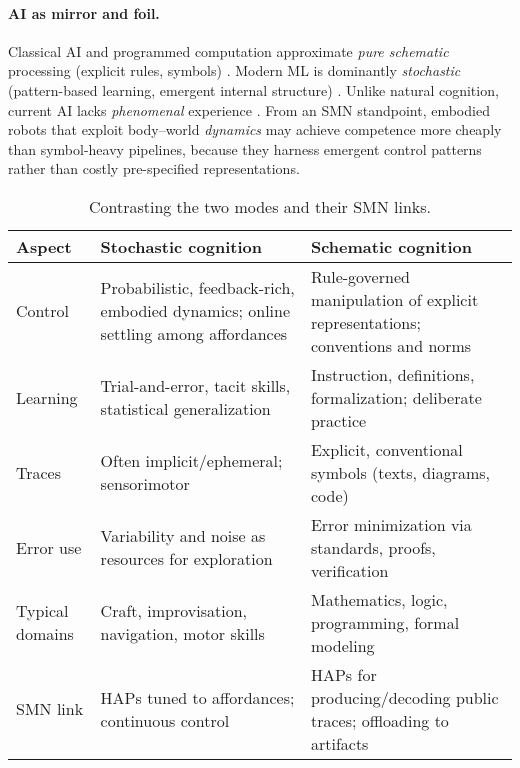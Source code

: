 \paragraph{AI as mirror and foil.}
Classical AI and programmed computation approximate \emph{pure schematic} processing (explicit rules, symbols) \citep{NewellSimon1976Symbols}. 
Modern ML is dominantly \emph{stochastic} (pattern-based learning, emergent internal structure) \citep{Rumelhart1986Backprop,Lake2017ThinkLikePeople}. 
Unlike natural cognition, current AI lacks \emph{phenomenal} experience \citep{Chalmers1995FacingUp,Block1995OnConfusion}. 
From an SMN standpoint, embodied robots that exploit body--world \emph{dynamics} may achieve competence more cheaply than symbol-heavy pipelines, because they harness emergent control patterns rather than costly pre-specified representations.

\begin{table}[t]
  \centering
  \small
  \caption{Contrasting the two modes and their SMN links.}
  \label{tab:stochastic_vs_schematic}
  \begin{tabular}{p{} p{} p{}}
    \toprule
    \textbf{Aspect} & \textbf{Stochastic cognition} & \textbf{Schematic cognition} \\
    \midrule
    Control & Probabilistic, feedback-rich, embodied dynamics; online settling among affordances \citep{PezzuloCisek2016Affordance} & Rule-governed manipulation of explicit representations; conventions and norms \citep{Lewis1969Convention} \\
    Learning & Trial-and-error, tacit skills, statistical generalization \citep{Schmidt1975Schema,Tenenbaum2011GrowMind} & Instruction, definitions, formalization; deliberate practice \citep{Dehaene2009Reading} \\
    Traces & Often implicit/ephemeral; sensorimotor & Explicit, conventional symbols (texts, diagrams, code) \citep{Donald1991Origins} \\
    Error use & Variability and noise as resources for exploration & Error minimization via standards, proofs, verification \\
    Typical domains & Craft, improvisation, navigation, motor skills & Mathematics, logic, programming, formal modeling \citep{NewellSimon1976Symbols} \\
    SMN link & HAPs tuned to affordances; continuous control & HAPs for producing/decoding public traces; offloading to artifacts \citep{ClarkChalmers1998Extended} \\
    \bottomrule
  \end{tabular}
\end{table}

